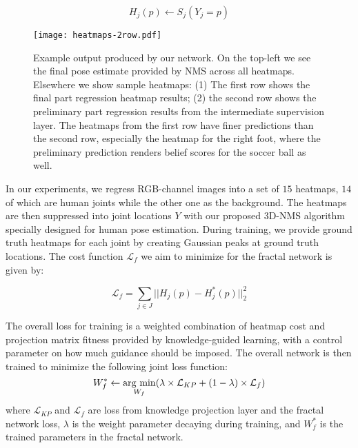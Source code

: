 \documentclass[journal ]{IEEEtran}
\newcommand{\argmin}{\operatornamewithlimits{arg\ min}} \usepackage[linesnumbered,ruled]{algorithm2e}
\begin{document}
\begin{equation}
H_{j}(p) \leftarrow S_{j}(Y_{j} = p)
\end{equation}

\begin{figure*}[t]
	\begin{center}
		\texttt{[image: heatmaps-2row.pdf]}
	\end{center}
	\caption{Example output produced by our network. On the top-left we see the final pose estimate provided by NMS across all heatmaps. Elsewhere we show sample heatmaps: (1) The first row shows the final part regression heatmap results; (2) the second row shows the preliminary part regression results from the intermediate supervision layer. The heatmaps from the first row have finer predictions than the second row, especially the heatmap for the right foot, where the preliminary prediction renders belief scores for the soccer ball as well. }
	\label{fig:heatmaps}
\end{figure*}

In our experiments, we regress RGB-channel images into a set of $15$ heatmaps, $14$ of which are human joints while the other one as the background. The heatmaps are then suppressed into joint locations $Y$ with our proposed 3D-NMS algorithm specially designed for human pose estimation.
During training, we provide ground truth heatmaps for each joint by creating Gaussian peaks at ground truth locations. The cost function $\mathcal{L}_{f}$ we aim to minimize for the fractal network is given by:

\begin{equation}
\mathcal{L}_{f} = \sum_{j \in J}||H_{j}(p) - H_{j}^{*}(p)||_{2}^{2}
\end{equation}

The overall loss for training is a weighted combination of heatmap cost and projection matrix fitness provided by knowledge-guided learning, with a control parameter on how much guidance should be imposed. 
The overall network is then trained to minimize the following joint loss function:
\begin{equation}
W_{f}^{*} \leftarrow \argmin_{W_{f}}(\lambda \times \mathcal{L}_{KP} + (1 - \lambda) \times \mathcal{L}_{f})
\end{equation}
where $\mathcal{L}_{KP}$ and $\mathcal{L}_{f}$ are loss from knowledge projection layer and the fractal network loss, $\lambda$ is the weight parameter decaying during training, and $W_{f}^{*}$ is the trained parameters in the fractal network.
\end{document}
